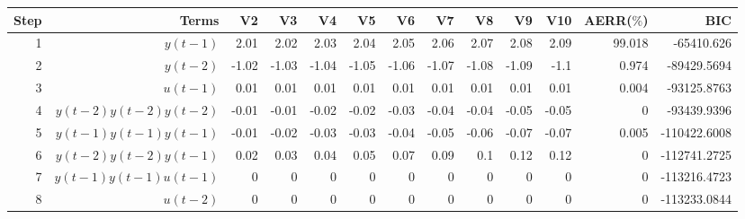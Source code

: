 \begin{tabular}{rrrrrrrrrrrrr}
Step & Terms & V2 & V3 & V4 & V5 & V6 & V7 & V8 & V9 & V10 & AERR($\%$) & BIC \\ 
\hline 
1 & $y(t-1)$ & 2.01 & 2.02 & 2.03 & 2.04 & 2.05 & 2.06 & 2.07 & 2.08 & 2.09 & 99.018 & -65410.626 \\ 
2 & $y(t-2)$ & -1.02 & -1.03 & -1.04 & -1.05 & -1.06 & -1.07 & -1.08 & -1.09 & -1.1 & 0.974 & -89429.5694 \\ 
3 & $u(t-1)$ & 0.01 & 0.01 & 0.01 & 0.01 & 0.01 & 0.01 & 0.01 & 0.01 & 0.01 & 0.004 & -93125.8763 \\ 
4 & $y(t-2)y(t-2)y(t-2)$ & -0.01 & -0.01 & -0.02 & -0.02 & -0.03 & -0.04 & -0.04 & -0.05 & -0.05 & 0 & -93439.9396 \\ 
5 & $y(t-1)y(t-1)y(t-1)$ & -0.01 & -0.02 & -0.03 & -0.03 & -0.04 & -0.05 & -0.06 & -0.07 & -0.07 & 0.005 & -110422.6008 \\ 
6 & $y(t-2)y(t-2)y(t-1)$ & 0.02 & 0.03 & 0.04 & 0.05 & 0.07 & 0.09 & 0.1 & 0.12 & 0.12 & 0 & -112741.2725 \\ 
7 & $y(t-1)y(t-1)u(t-1)$ & 0 & 0 & 0 & 0 & 0 & 0 & 0 & 0 & 0 & 0 & -113216.4723 \\ 
8 & $u(t-2)$ & 0 & 0 & 0 & 0 & 0 & 0 & 0 & 0 & 0 & 0 & -113233.0844 \\ 
\hline 
\end{tabular}